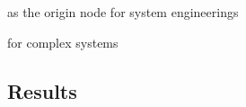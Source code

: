 \documentclass[runningheads,a4paper]{llncs2e/llncs}
\begin{document}

\cite{estefan2007survey} as the origin node for system engineerings

\cite{newman2011complex} for complex systems
\cite{stone2000multiagent}

\subsection{Results}


\cite{hasan2013spatiotemporal}






%








\end{document}
